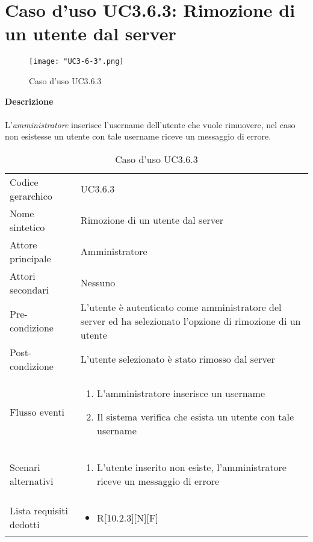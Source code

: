 \documentclass[a4paper]{report}
\begin{document}
	 \section{Caso d'uso UC3.6.3: Rimozione di un utente dal server}
	 \begin{figure}[H]
			\centering
			\texttt{[image: "UC3-6-3".png]}
			\caption{Caso d'uso UC3.6.3}
		\end{figure}
	 \textbf{Descrizione} \\ \\
	 L'\emph{amministratore} inserisce l'username dell'utente che vuole rimuovere, nel caso non esistesse
	  un utente con tale username riceve un messaggio di errore. \\
		\begin{table}[H]
		\begin{tabularx}{\textwidth}{X | X}\toprule
			\rowcolor{orange!65}Codice gerarchico & UC3.6.3 \\
			Nome sintetico & Rimozione di un utente dal server \\
			\rowcolor{orange!65}Attore principale & Amministratore\\
			Attori secondari & Nessuno \\
			\rowcolor{orange!65}Pre-condizione & L'utente è autenticato come amministratore del server ed
			 ha selezionato l'opzione di rimozione di un utente\\
			Post-condizione & L'utente selezionato è stato rimosso dal server\\
			\rowcolor{orange!65}Flusso eventi & \begin{enumerate}
			\item L'amministratore inserisce un username
			\item Il sistema verifica che esista un utente con tale username
			\end{enumerate} \\
			Scenari alternativi & \begin{enumerate}
			\item L'utente inserito non esiste, l'amministratore riceve un messaggio di errore
			\end{enumerate} \\
			\rowcolor{orange!65}Lista requisiti dedotti & \begin{itemize}
				\item R[10.2.3][N][F]
				\end{itemize} \\
			\bottomrule
		\end{tabularx}
		\caption{Caso d'uso UC3.6.3}
	 \end{table}
\end{document}
